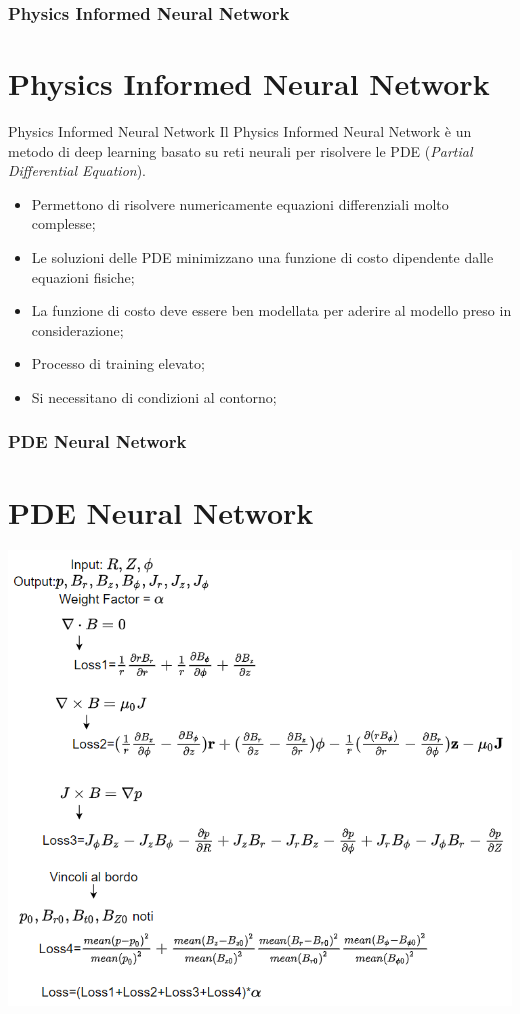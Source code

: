 \documentclass{beamer}
\begin{document}
\begin{frame}
	\frametitle{Physics Informed Neural Network}
	\section{Physics Informed Neural Network}
	\begin{block}{Physics Informed Neural Network}
		Il Physics Informed Neural Network è un metodo di deep learning basato su reti neurali per risolvere le PDE (\emph{Partial Differential Equation}).
	\end{block}
	\begin{itemize}
		\item Permettono di risolvere numericamente equazioni differenziali molto complesse;
		\item Le soluzioni delle PDE minimizzano una funzione di costo dipendente dalle equazioni fisiche;
		\item La funzione di costo deve essere ben modellata per aderire al modello preso in considerazione;
		\item Processo di training elevato;
		\item Si necessitano di condizioni al contorno;
	\end{itemize}
\end{frame}
\begin{frame}
	\frametitle{PDE Neural Network}
	\section{PDE Neural Network}
	\vspace{0.1cm}
		\includegraphics[scale=0.5]{2022-06-07-15-51-42.png}%

\end{frame}
\end{document}
